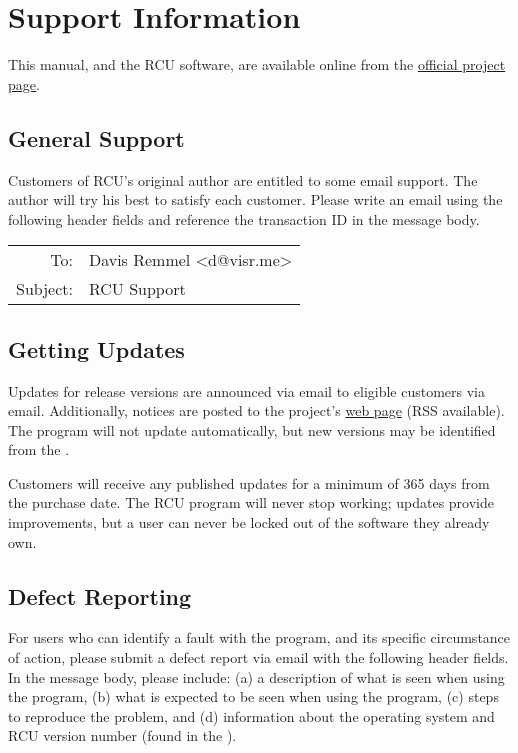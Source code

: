 \chapter{Support Information}
This manual, and the RCU software, are available online from the \href{http://www.davisr.me/projects/rcu/}{official project page}.

\section{General Support}

Customers of RCU's original author are entitled to some email support. The author will try his best to satisfy each customer. Please write an email using the following header fields and reference the transaction ID in the message body.

\vspace{0.5cm}
\begin{tabular}{rl}
To:& Davis Remmel \textless d@visr.me\textgreater \\
Subject:& RCU Support
\end{tabular}


\section{Getting Updates}

Updates for release versions are announced via email to eligible customers via email. Additionally, notices are posted to the project's \href{http://www.davisr.me/projects/rcu/}{web page} (RSS available). The program will not update automatically, but new versions may be identified from the .

Customers will receive any published updates for a minimum of 365 days from the purchase date. The RCU program will never stop working; updates provide improvements, but a user can never be locked out of the software they already own.


\section{Defect Reporting}

For users who can identify a fault with the program, and its specific circumstance of action, please submit a defect report via email with the following header fields. In the message body, please include: (a) a description of what is seen when using the program, (b) what is expected to be seen when using the program, (c) steps to reproduce the problem, and (d) information about the operating system and RCU version number (found in the ).

